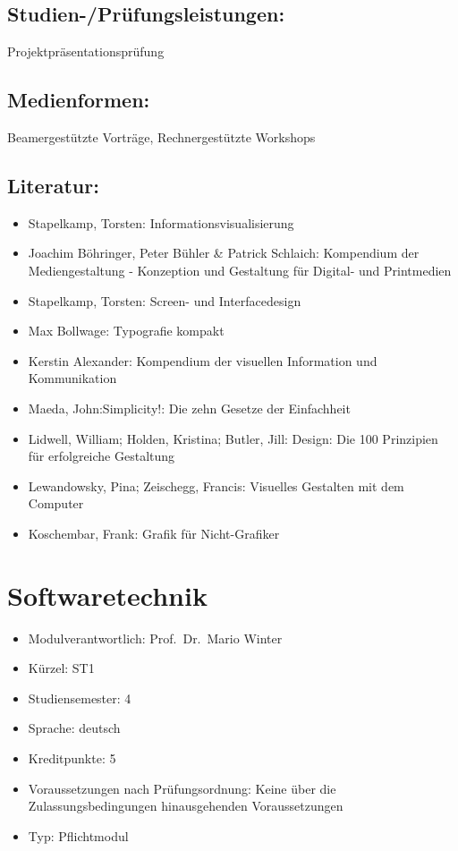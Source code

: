\section*{Studien-/Prüfungsleistungen:}\label{studien-pruxfcfungsleistungen-19}

Projektpräsentationsprüfung

\section*{Medienformen:}\label{medienformen-12}

Beamergestützte Vorträge, Rechnergestützte Workshops

\section*{Literatur:}\label{literatur-17}

\begin{itemize}
\tightlist
\item
  Stapelkamp, Torsten: Informationsvisualisierung
\item
  Joachim Böhringer, Peter Bühler \& Patrick Schlaich: Kompendium der
  Mediengestaltung - Konzeption und Gestaltung für Digital- und
  Printmedien
\item
  Stapelkamp, Torsten: Screen- und Interfacedesign
\item
  Max Bollwage: Typografie kompakt
\item
  Kerstin Alexander: Kompendium der visuellen Information und
  Kommunikation
\item
  Maeda, John:Simplicity!: Die zehn Gesetze der Einfachheit
\item
  Lidwell, William; Holden, Kristina; Butler, Jill: Design: Die 100
  Prinzipien für erfolgreiche Gestaltung
\item
  Lewandowsky, Pina; Zeischegg, Francis: Visuelles Gestalten mit dem
  Computer
\item
  Koschembar, Frank: Grafik für Nicht-Grafiker
\end{itemize}

\chapter{Softwaretechnik}\label{softwaretechnik}

\begin{itemize}
\tightlist
\item
  Modulverantwortlich: Prof.~Dr.~Mario Winter
\item
  Kürzel: ST1
\item
  Studiensemester: 4
\item
  Sprache: deutsch
\item
  Kreditpunkte: 5
\item
  Voraussetzungen nach Prüfungsordnung: Keine über die
  Zulassungsbedingungen hinausgehenden Voraussetzungen
\item
  Typ: Pflichtmodul
\end{itemize}

